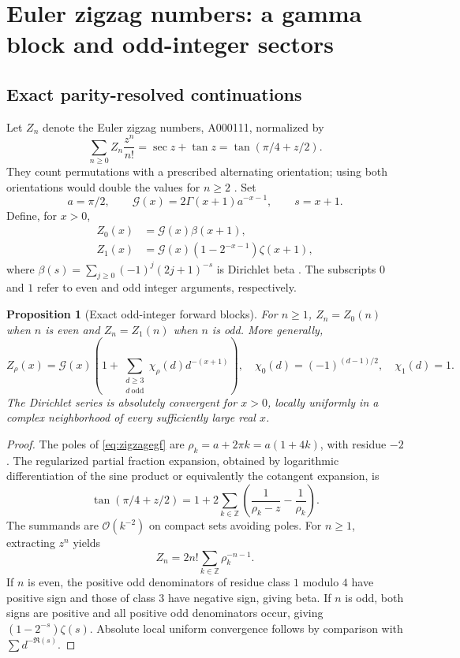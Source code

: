 \documentclass[11pt,a4paper]{article}
\newtheorem{proposition}[theorem]{Proposition}
\theoremstyle{definition}
\theoremstyle{remark}
\newcommand{\OO}{\mathcal O}
\numberwithin{equation}{section}
\begin{document}
\section{Euler zigzag numbers: a gamma block and odd-integer sectors}
\label{sec:zigzag}

\subsection{Exact parity-resolved continuations}
Let $Z_n$ denote the Euler zigzag numbers, A000111, normalized by
\begin{equation}
 \sum_{n\ge0}Z_n\frac{z^n}{n!}=\sec z+\tan z
 =\tan(\pi/4+z/2).
 \label{eq:zigzagegf}
\end{equation}
They count permutations with a prescribed alternating orientation; using both orientations would double the values for $n\ge2$ \cite{oeiszigzag}. Set
\begin{equation}
 a=\pi/2,\qquad \mathcal G(x)=2\Gamma(x+1)a^{-x-1},\qquad s=x+1.
 \label{eq:zigzaggamma}
\end{equation}
Define, for $x>0$,
\begin{align}
 Z_0(x)&=\mathcal G(x)\beta(x+1),\nonumber\\
 Z_1(x)&=\mathcal G(x)(1-2^{-x-1})\zeta(x+1),
 \label{eq:zigzaginterp}
\end{align}
where $\beta(s)=\sum_{j\ge0}(-1)^j(2j+1)^{-s}$ is Dirichlet beta \cite{wlbeta}. The subscripts $0$ and $1$ refer to even and odd integer arguments, respectively.

\begin{proposition}[Exact odd-integer forward blocks]
For $n\ge1$,
$Z_n=Z_0(n)$ when $n$ is even and $Z_n=Z_1(n)$ when $n$ is odd. More generally,
\begin{equation}
 Z_\rho(x)=\mathcal G(x)
 \left(1+\sum_{\substack{d\ge3\\d\ \mathrm{odd}}}
 \chi_\rho(d)d^{-(x+1)}\right),
 \quad
 \chi_0(d)=(-1)^{(d-1)/2},\quad \chi_1(d)=1.
 \label{eq:zigzagdirichlet}
\end{equation}
The Dirichlet series is absolutely convergent for $x>0$, locally uniformly in a complex neighborhood of every sufficiently large real $x$.
\end{proposition}
\begin{proof}
The poles of \eqref{eq:zigzagegf} are $\rho_k=a+2\pi k=a(1+4k)$, with residue $-2$. The regularized partial fraction expansion, obtained by logarithmic differentiation of the sine product or equivalently the cotangent expansion, is
\[
 \tan(\pi/4+z/2)=1+
 2\sum_{k\in\mathbb Z}\left(\frac1{\rho_k-z}-\frac1{\rho_k}\right).
\]
The summands are $\OO(k^{-2})$ on compact sets avoiding poles. For $n\ge1$, extracting $z^n$ yields
\[
 Z_n=2n!\sum_{k\in\mathbb Z}\rho_k^{-n-1}.
\]
If $n$ is even, the positive odd denominators of residue class $1$ modulo $4$ have positive sign and those of class $3$ have negative sign, giving beta. If $n$ is odd, both signs are positive and all positive odd denominators occur, giving $(1-2^{-s})\zeta(s)$. Absolute local uniform convergence follows by comparison with $\sum d^{-\Re(s)}$.
\end{proof}
\end{document}
